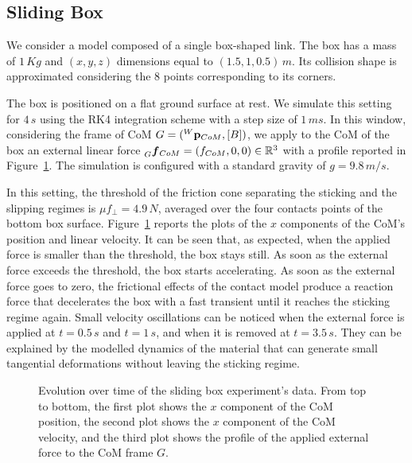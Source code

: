 \subsection{Sliding Box}

We consider a model composed of a single box-shaped link.
The box has a mass of $1 \, Kg$ and $(x, y, z)$ dimensions equal to $(1.5, 1, 0.5) \, m$.
Its collision shape is approximated considering the 8 points corresponding to its corners.

The box is positioned on a flat ground surface at rest.
We simulate this setting for $4 \, s$ using the \ac{RK4} integration scheme with a step size of $1 \, ms$.
In this window, considering the frame of \ac{CoM} $G = (\pos[W]_{CoM}, [B])$, we apply to the \ac{CoM} of the box an external linear force $\forcelin[G]_{CoM} = (f_{CoM}, 0, 0) \in \realn^3$ with a profile reported in Figure~\ref{fig:sliding_box}.
The simulation is configured with a standard gravity of $g = 9.8 \, m/s$.

In this setting, the threshold of the friction cone separating the sticking and the slipping regimes is $\mu f_\perp = 4.9 \, N$, averaged over the four contacts points of the bottom box surface.
Figure~\ref{fig:sliding_box} reports the plots of the $x$ components of the \ac{CoM}'s position and linear velocity.
It can be seen that, as expected, when the applied force is smaller than the threshold, the box stays still.
As soon as the external force exceeds the threshold, the box starts accelerating.
As soon as the external force goes to zero, the frictional effects of the contact model produce a reaction force that decelerates the box with a fast transient until it reaches the sticking regime again.
Small velocity oscillations can be noticed when the external force is applied at $t=0.5 \, s$ and $t=1 \, s$, and when it is removed at $t=3.5 \, s$.
They can be explained by the modelled dynamics of the material that can generate small tangential deformations without leaving the sticking regime.

\begin{figure}
    \centering
    \caption{Evolution over time of the sliding box experiment's data. From top to bottom, the first plot shows the $x$ component of the \ac{CoM} position, the second plot shows the $x$ component of the \ac{CoM} velocity, and the third plot shows the profile of the applied external force to the \ac{CoM} frame $G$.}
    \label{fig:sliding_box}
\end{figure}

